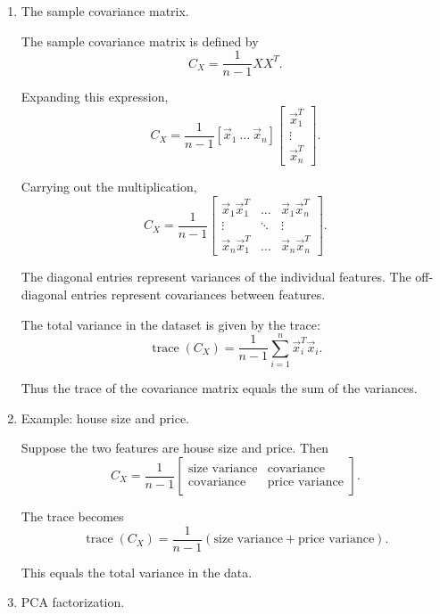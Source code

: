 \documentclass{article}
\begin{document}
\begin{enumerate}
From this point forward, we assume the data has been centered and simply write $X = \hat{X}$.

Centering ensures that the origin represents the mean of the dataset and simplifies the covariance formulas.

\item The sample covariance matrix.

The sample covariance matrix is defined by
\[
C_X
=
\frac{1}{n-1} X X^T.
\]

Expanding this expression,
\[
C_X
=
\frac{1}{n-1}
[\vec{x}_1 \ \dots \ \vec{x}_n]
\begin{bmatrix}
\vec{x}_1^T \\
\vdots \\
\vec{x}_n^T
\end{bmatrix}.
\]

Carrying out the multiplication,
\[
C_X
=
\frac{1}{n-1}
\begin{bmatrix}
\vec{x}_1 \vec{x}_1^T & \dots & \vec{x}_1 \vec{x}_n^T \\
\vdots & \ddots & \vdots \\
\vec{x}_n \vec{x}_1^T & \dots & \vec{x}_n \vec{x}_n^T
\end{bmatrix}.
\]

The diagonal entries represent variances of the individual features. The off-diagonal entries represent covariances between features.

The total variance in the dataset is given by the trace:
\[
\operatorname{trace}(C_X)
=
\frac{1}{n-1}
\sum_{i=1}^{n}
\vec{x}_i^T \vec{x}_i.
\]

Thus the trace of the covariance matrix equals the sum of the variances.

\item Example: house size and price.

Suppose the two features are house size and price. Then
\[
C_X
=
\frac{1}{n-1}
\begin{bmatrix}
\text{size variance} & \text{covariance} \\
\text{covariance} & \text{price variance}
\end{bmatrix}.
\]

The trace becomes
\[
\operatorname{trace}(C_X)
=
\frac{1}{n-1}
(\text{size variance} + \text{price variance}).
\]

This equals the total variance in the data.

\item PCA factorization.


\end{enumerate}
\end{document}
